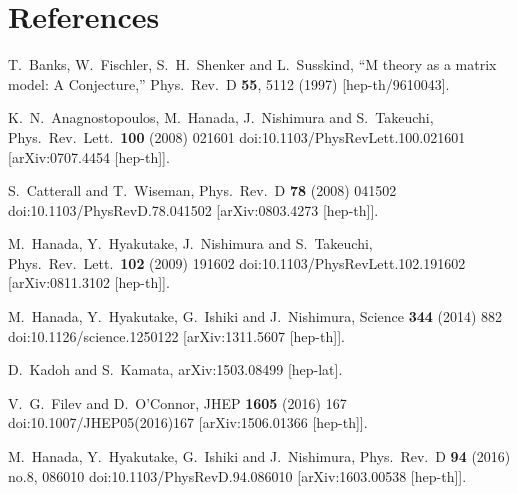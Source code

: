 \documentclass[a4paper]{jpconf}
\begin{document}
\section*{References}
\begin{thebibliography}{9}
  T.~Banks, W.~Fischler, S.~H.~Shenker and L.~Susskind,
  ``M theory as a matrix model: A Conjecture,''
  Phys.\ Rev.\ D {\bf 55}, 5112 (1997)
  [hep-th/9610043].

  K.~N.~Anagnostopoulos, M.~Hanada, J.~Nishimura and S.~Takeuchi,
  Phys.\ Rev.\ Lett.\  {\bf 100} (2008) 021601
  doi:10.1103/PhysRevLett.100.021601
  [arXiv:0707.4454 [hep-th]].

  S.~Catterall and T.~Wiseman,
  Phys.\ Rev.\ D {\bf 78} (2008) 041502
  doi:10.1103/PhysRevD.78.041502
  [arXiv:0803.4273 [hep-th]].

  M.~Hanada, Y.~Hyakutake, J.~Nishimura and S.~Takeuchi,
  Phys.\ Rev.\ Lett.\  {\bf 102} (2009) 191602
  doi:10.1103/PhysRevLett.102.191602
  [arXiv:0811.3102 [hep-th]].

  M.~Hanada, Y.~Hyakutake, G.~Ishiki and J.~Nishimura,
  Science {\bf 344} (2014) 882
  doi:10.1126/science.1250122
  [arXiv:1311.5607 [hep-th]].


  D.~Kadoh and S.~Kamata,
  arXiv:1503.08499 [hep-lat].

  V.~G.~Filev and D.~O'Connor,
  JHEP {\bf 1605} (2016) 167
  doi:10.1007/JHEP05(2016)167
  [arXiv:1506.01366 [hep-th]].

  M.~Hanada, Y.~Hyakutake, G.~Ishiki and J.~Nishimura,
  Phys.\ Rev.\ D {\bf 94} (2016) no.8,  086010
  doi:10.1103/PhysRevD.94.086010
  [arXiv:1603.00538 [hep-th]].



\end{thebibliography}
\end{document}
